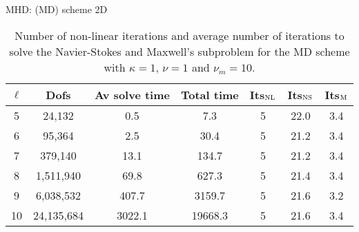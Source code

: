 \documentclass{beamer}
\begin{document}
\begin{frame}{MHD: (MD) scheme 2D}
  \begin{table}[h!] \small
  \begin{center}
  \begin{tabular}{ccccccc}
  \hline
  $\ell$ &      Dofs &  Av solve time &  Total time &  Its$_{\rm NL}$ &     Its$_{\rm NS}$ &    Its$_{\rm M}$ \\
  \hline
   5 &    24,132 &       0.5 &           7.3 &                  5 &        22.0 &        3.4 \\
   6 &    95,364 &       2.5 &          30.4 &                  5 &        21.2 &        3.4 \\
   7 &   379,140 &      13.1 &         134.7 &                  5 &        21.2 &        3.4 \\
   8 &  1,511,940 &      69.8 &         627.3 &                  5 &        21.4 &        3.4 \\
   9 &  6,038,532 &     407.7 &        3159.7 &                  5 &        21.6 &        3.2 \\
    10 &  24,135,684 &    3022.1 &       19668.3 &                  5 &        21.6 &        3.4 \\
  \hline
  \end{tabular}
  \caption{Number of non-linear iterations and average number of iterations to solve the Navier-Stokes and Maxwell's subproblem for the MD scheme with $\kappa = 1$, $\nu = 1$ and $\nu_m = 10$.}
  \label{tab:MD_large_scale}
  \end{center}
  \end{table}

\end{frame}
\end{document}
